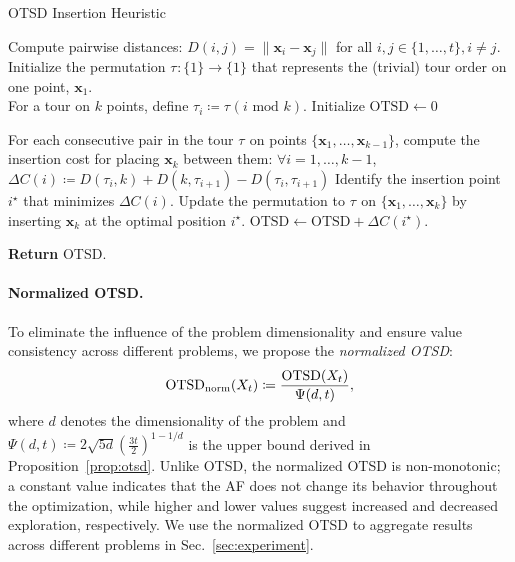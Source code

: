 \documentclass[accepted]{uai2025}
\newcommand{\perm}[1][]{\tau_{#1}}
\begin{document}
\begin{algorithm}[ht]
    \DontPrintSemicolon
    \caption{OTSD Insertion Heuristic\label{alg:otsd}}
    
    \begin{algorithmic}[1]
        \STATE Compute pairwise distances: $D(i,j) = \|\bm{x}_i - \bm{x}_j\|$ for all $i,j \in \{1, \dots, t\}, i\neq j$.
        \STATE Initialize the permutation $\perm: \{1\} \to \{1\}$ that represents the (trivial) tour order on one point, $\bm{x}_1$.  \\ %
        For a tour on $k$ points, define $\perm[i] \coloneqq\perm(i \text{ mod } k)$.
        \STATE Initialize $\text{OTSD} \gets 0$
        
            \STATE For each consecutive pair in the tour $\perm$ on points $\{\bm{x}_1,  \dots, \bm{x}_{k-1}\}$, compute the insertion cost for placing $\bm{x}_k$ between them:  $\forall i=1,\ldots,k-1$, \\
            $\Delta C(i) \coloneqq D(\perm[i],k) + D(k, \perm[i+1]) - D(\perm[i], \perm[i+1])$            
            \STATE Identify the insertion point $i^\star$ 
            that minimizes $\Delta C(i)$.\!
            \STATE Update the permutation 
            to $\perm$ on 
            $\{\bm{x}_1,  \dots, \bm{x}_{k}\}$
            by inserting $\bm{x}_k$ at the optimal position $i^\star$. 
            \STATE $\text{OTSD} \gets \text{OTSD} + \Delta C(i^\star)$.
        \ENDFOR        
        
        \STATE \textbf{Return} OTSD.
    \end{algorithmic}
\end{algorithm}

\paragraph{Normalized OTSD.}
To eliminate the influence of the problem dimensionality and ensure value consistency across different problems, we propose the \emph{normalized \ac{OTSD}}:
\begin{equation}
\label{eq:otsd-norm-def}
    \textup{OTSD}_\text{norm}(X_t) \coloneqq \frac{\textup{OTSD}(X_t)}{\Psi(d, t)},
\end{equation}
where $d$ denotes the dimensionality of the problem and $\Psi(d, t) \coloneqq 2\sqrt{5d}\left(\frac{3t}{2}\right)^{1-1/d}$ is the upper bound derived in Proposition~\ref{prop:otsd}. Unlike \ac{OTSD}, the normalized \ac{OTSD} is non-monotonic; a constant value indicates that the \ac{AF} does not change its behavior throughout the optimization, while higher and lower values suggest increased and decreased exploration, respectively.
We use the normalized \ac{OTSD} to aggregate results across different problems in Sec.~\ref{sec:experiment}.
\end{document}
